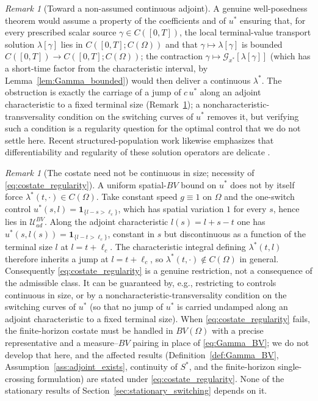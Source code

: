 \documentclass[pdflatex,sn-mathphys-num]{sn-jnl}
\newcommand{\Om}{\Omega}
\newcommand{\UadBV}{\mathcal{U}_{ad}^{BV}}
\theoremstyle{plain}
\theoremstyle{definition}
\theoremstyle{remark}
\newtheorem{remark}[theorem]{Remark}
\begin{document}
\begin{remark}[Toward a non-assumed continuous adjoint]
\label{rmk:adjoint_sufficient}
A genuine well-posedness theorem would assume a property of the coefficients and of
$u^*$ ensuring that, for every prescribed scalar source $\gamma\in C([0,T])$, the
local terminal-value transport solution $\lambda[\gamma]$ lies in
$C([0,T];C(\Om))$ and that $\gamma\mapsto\lambda[\gamma]$ is bounded
$C([0,T])\to C([0,T];C(\Om))$; the contraction
$\gamma\mapsto\mathcal G_{x^*}[\lambda[\gamma]]$ (which has a short-time factor
from the characteristic interval, by Lemma~\ref{lem:Gamma_bounded}) would then
deliver a continuous $\lambda^*$. The obstruction is exactly the carriage of a
jump of $c\,u^*$ along an adjoint characteristic to a fixed terminal size
(Remark~\ref{rmk:costate_discontinuity}); a noncharacteristic-transversality
condition on the switching curves of $u^*$ removes it, but verifying such a
condition is a regularity question for the optimal control that we do not settle
here. Recent structured-population work likewise emphasizes that differentiability
and regularity of these solution operators are delicate
\cite{diekmann2025age}.
\end{remark}

\begin{remark}[The costate need not be continuous in size; necessity of \eqref{eq:costate_regularity}]
\label{rmk:costate_discontinuity}
A uniform spatial-$BV$ bound on $u^*$ does not by itself force
$\lambda^*(t,\cdot)\in C(\Om)$. Take constant speed $g\equiv1$ on $\Om$ and the
one-switch control $u^*(s,l)=\mathbf 1_{\{l-s>\ell_c\}}$, which has spatial
variation $1$ for every $s$, hence lies in $\UadBV$. Along the adjoint
characteristic $l(s)=l+s-t$ one has $u^*(s,l(s))=\mathbf 1_{\{l-t>\ell_c\}}$,
constant in $s$ but discontinuous as a function of the terminal size $l$ at
$l=t+\ell_c$. The characteristic integral defining $\lambda^*(t,l)$ therefore
inherits a jump at $l=t+\ell_c$, so $\lambda^*(t,\cdot)\notin C(\Om)$ in general.
Consequently \eqref{eq:costate_regularity} is a genuine restriction, not a
consequence of the admissible class. It can be guaranteed by, e.g.,
restricting to controls continuous in size, or by a noncharacteristic-transversality
condition on the switching curves of $u^*$ (so that no jump of $u^*$ is carried
undamped along an adjoint characteristic to a fixed terminal size). When
\eqref{eq:costate_regularity} fails, the finite-horizon costate must be handled in
$BV(\Om)$ with a precise representative and a measure--$BV$ pairing in place of
\eqref{eq:Gamma_BV}; we do not develop that here, and the affected results
(Definition~\ref{def:Gamma_BV}, Assumption~\ref{ass:adjoint_exists},
continuity of $S^*$, and the finite-horizon single-crossing formulation) are
stated under \eqref{eq:costate_regularity}. None of the stationary results of
Section~\ref{sec:stationary_switching} depends on it.
\end{remark}
\end{document}
